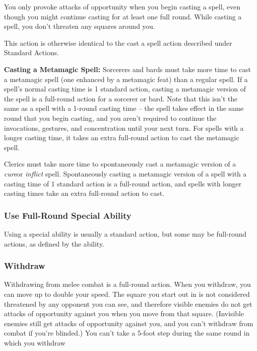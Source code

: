 You only provoke attacks of opportunity when you begin casting a spell, even though you might continue casting for at least one full round. While casting a spell, you don't threaten any squares around you.

This action is otherwise identical to the cast a spell action described under Standard Actions.

\textbf{Casting a Metamagic Spell:} Sorcerers and bards must take more time to cast a metamagic spell (one enhanced by a metamagic feat) than a regular spell. If a spell's normal casting time is 1 standard action, casting a metamagic version of the spell is a full-round action for a sorcerer or bard. Note that this isn't the same as a spell with a 1-round casting time -- the spell takes effect in the same round that you begin casting, and you aren't required to continue the invocations, gestures, and concentration until your next turn. For spells with a longer casting time, it takes an extra full-round action to cast the metamagic spell.

Clerics must take more time to spontaneously cast a metamagic version of a \textit{cure}or \textit{inflict} spell. Spontaneously casting a metamagic version of a spell with a casting time of 1 standard action is a full-round action, and spells with longer casting times take an extra full-round action to cast.

\subsubsection{Use Full-Round Special Ability}

Using a special ability is usually a standard action, but some may be full-round actions, as defined by the ability.

\subsubsection{Withdraw}

Withdrawing from melee combat is a full-round action. When you withdraw, you can move up to double your speed. The square you start out in is not considered threatened by any opponent you can see, and therefore visible enemies do not get attacks of opportunity against you when you move from that square. (Invisible enemies still get attacks of opportunity against you, and you can't withdraw from combat if you're blinded.) You can't take a 5-foot step during the same round in which you withdraw 

